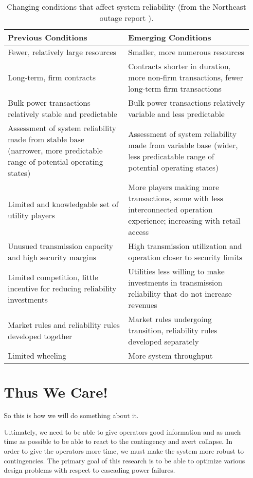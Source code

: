 \documentclass[class=report]{standalone}
\begin{document}
\begin{table}
\centering
\footnotesize
\begin{tabular}{| p{7cm} | p{7cm} |}
\hline
\bf Previous Conditions 	&	\bf Emerging Conditions 		\\	\hline  	\hline
Fewer, relatively large resources	&	Smaller, more numerous resources		\\	\hline
Long-term, firm contracts 	&	Contracts shorter in duration, more non-firm transactions, fewer long-term firm transactions	\\	\hline
Bulk power transactions relatively stable and predictable	&	Bulk power transactions relatively variable and less predictable	\\	\hline
Assessment of system reliability made from stable base (narrower, more predictable range of potential operating states)	&	Assessment of system reliability made from variable base (wider, less predicatable range of potential operating states)		\\		\hline
Limited and knowledgable set of utility players 	&	More players making more transactions, some with less interconnected operation experience; increasing with retail access	\\	\hline
Unusued transmission capacity and high security margins	&	High transmission utilization and operation closer to security limits	\\	\hline
Limited competition, little incentive for reducing reliability investments	&	Utilities less willing to make investments in transmission reliability that do not increase revenues	\\	\hline
Market rules and reliability rules developed together	&	Market rules undergoing transition, reliability rules developed separately	\\	\hline
Limited wheeling	&	More system throughput	\\	\hline
\end{tabular}
\caption{\small Changing conditions that affect system reliability (from the Northeast outage report \cite{northeast_2003}).}
 \label{tab:change1}
\end{table}

\section{Thus We Care!}
So this is how we will do something about it.

Ultimately, we need to be able to give operators good information and as much time as possible to be able to react to the contingency and avert collapse.  In order to give the operators more time, we must make the system more robust to contingencies.  The primary goal of this research is to be able to optimize various design problems with respect to cascading power failures. 
\end{document}
